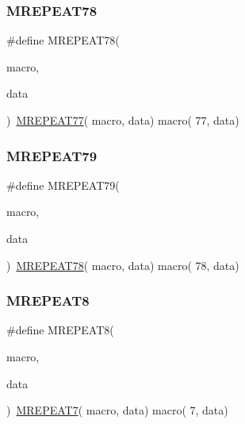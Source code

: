 \mbox{\label{group__group__sam0__utils__mrepeat_ga970169b9fc014f633cefa289e7acc5f7}} 
\subsubsection{\texorpdfstring{MREPEAT78}{MREPEAT78}}
{\footnotesize\ttfamily \#define M\+R\+E\+P\+E\+A\+T78(\begin{DoxyParamCaption}\item[{}]{macro,  }\item[{}]{data }\end{DoxyParamCaption})~\mbox{\hyperlink{group__group__sam0__utils__mrepeat_ga1831e4c1682945001b9b5fc06dedc788}{M\+R\+E\+P\+E\+A\+T77}}( macro, data)   macro( 77, data)}

\mbox{\label{group__group__sam0__utils__mrepeat_ga8ca389624ac706853a8b95daa9b60074}} 
\subsubsection{\texorpdfstring{MREPEAT79}{MREPEAT79}}
{\footnotesize\ttfamily \#define M\+R\+E\+P\+E\+A\+T79(\begin{DoxyParamCaption}\item[{}]{macro,  }\item[{}]{data }\end{DoxyParamCaption})~\mbox{\hyperlink{group__group__sam0__utils__mrepeat_ga970169b9fc014f633cefa289e7acc5f7}{M\+R\+E\+P\+E\+A\+T78}}( macro, data)   macro( 78, data)}

\mbox{\label{group__group__sam0__utils__mrepeat_ga2c7b24c883b7d5dc1a7623220cd63d46}} 
\subsubsection{\texorpdfstring{MREPEAT8}{MREPEAT8}}
{\footnotesize\ttfamily \#define M\+R\+E\+P\+E\+A\+T8(\begin{DoxyParamCaption}\item[{}]{macro,  }\item[{}]{data }\end{DoxyParamCaption})~\mbox{\hyperlink{group__group__sam0__utils__mrepeat_ga62b2ea428fd7ac3b52107ef1e4ec984c}{M\+R\+E\+P\+E\+A\+T7}}(  macro, data)   macro(  7, data)}

